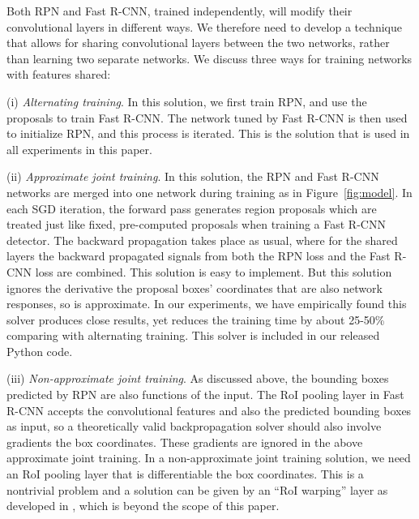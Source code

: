 \documentclass[10pt,journal,cspaper,compsoc]{IEEEtran}
\begin{document}
Both RPN and Fast R-CNN, trained independently, will modify their convolutional layers in different ways.
We therefore need to develop a technique that allows for sharing convolutional layers between the two networks, rather than learning two separate networks. We discuss three ways for training networks with features shared:

(i) \emph{Alternating training}. In this solution, we first train RPN, and use the proposals to train Fast R-CNN. The network tuned by Fast R-CNN is then used to initialize RPN, and this process is iterated. This is the solution that is used in all experiments in this paper.

(ii) \emph{Approximate joint training}. In this solution, the RPN and Fast R-CNN networks are merged into one network during training as in Figure~\ref{fig:model}. In each SGD iteration, the forward pass generates region proposals which are treated just like fixed, pre-computed proposals when training a Fast R-CNN detector.
The backward propagation takes place as usual, where for the shared layers the backward propagated signals from both the RPN loss and the Fast R-CNN loss are combined. This solution is easy to implement. But this solution ignores the derivative \wrt the proposal boxes' coordinates that are also network responses, so is approximate.
In our experiments, we have empirically found this solver produces close results, yet reduces the training time by about 25-50\% comparing with alternating training. This solver is included in our released Python code.

(iii) \emph{Non-approximate joint training}. As discussed above, the bounding boxes predicted by RPN are also functions of the input. The RoI pooling layer \cite{Girshick2015a} in Fast R-CNN accepts the convolutional features and also the predicted bounding boxes as input, so a theoretically valid backpropagation solver should also involve gradients \wrt the box coordinates. These gradients are ignored in the above approximate joint training.
In a non-approximate joint training solution, we need an RoI pooling layer that is differentiable \wrt the box coordinates.
This is a nontrivial problem and a solution can be given by an ``RoI warping'' layer as developed in \cite{Dai2015a}, which is beyond the scope of this paper.
\end{document}
